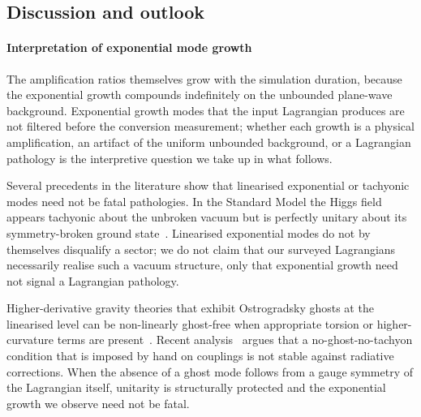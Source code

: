 \subsection{Discussion and outlook}%
\label{Discussion}

\paragraph*{Interpretation of exponential mode growth}
The amplification ratios themselves grow with the simulation duration,
because the exponential growth compounds indefinitely
on the unbounded plane-wave background.
Exponential growth modes that the input Lagrangian produces are not
filtered before the conversion measurement; whether each growth is a
physical amplification, an artifact of the uniform unbounded
background, or a Lagrangian pathology is the interpretive question we
take up in what follows.

Several precedents in the
literature show that linearised exponential or tachyonic modes need
not be fatal pathologies. In the Standard Model the Higgs field
appears tachyonic about the unbroken vacuum but is perfectly unitary
about its symmetry-broken ground state~\cite{legner2025torc}.
Linearised exponential modes do not by themselves disqualify
a sector; we do not claim that our surveyed Lagrangians
necessarily realise such a vacuum structure, only that exponential
growth need not signal a Lagrangian pathology.

Higher-derivative gravity theories that exhibit Ostrogradsky ghosts at
the linearised level can be non-linearly ghost-free when appropriate
torsion or higher-curvature terms are
present~\cite{aoki2020nonlinear,bahamonde2025cubic}.
Recent analysis~\cite{barker2025irfound1,barker2025irfound2}
argues that a no-ghost-no-tachyon condition that is imposed by hand
on couplings is not stable against radiative
corrections. When the absence of a ghost mode follows from a gauge
symmetry of the Lagrangian itself, unitarity is structurally
protected and the exponential growth we observe need not be fatal.

